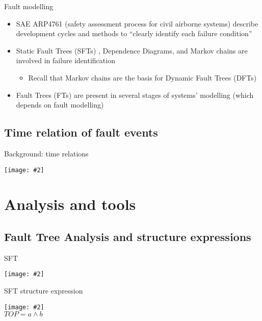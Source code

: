 \documentclass{beamer}
\def\FT{%
	Fault Tree (FT)%
	\gdef\FT{FT\xspace}%
	\gdef\FTs{FTs\xspace}%
	\gdef\IFT{An FT\xspace}%
	\xspace%
}
\def\FTs{%
	Fault Trees (FTs)%
	\gdef\FT{FT\xspace}%
	\gdef\FTs{FTs\xspace}%
	\gdef\IFT{An FT\xspace}%
	\xspace%
}
\def\IFT{%
	A Fault Tree (FT)%
	\gdef\FT{FT\xspace}%
	\gdef\FTs{FTs\xspace}%
	\gdef\IFT{An FT\xspace}%
	\xspace%
}
\def\SFT{%
	Static Fault Tree (SFT)%
	\gdef\SFT{SFT\xspace}%
	\gdef\SFTs{SFTs\xspace}%
	\xspace%
}
\def\SFTs{%
	Static Fault Trees (SFTs)%
	\gdef\SFT{SFT\xspace}%
	\gdef\SFTs{SFTs\xspace}%
	\xspace%
}
\def\DFT{%
	Dynamic Fault Tree (DFT)%
	\gdef\DFT{DFT\xspace}%
	\gdef\DFTs{DFTs\xspace}%
	\xspace%
}
\def\DFTs{%
	Dynamic Fault Trees (DFTs)%
	\gdef\DFT{DFT\xspace}%
	\gdef\DFTs{DFTs\xspace}%
	\xspace%
}
\newcommand{\includegraphicsaspectratio}[2][1]{%
  \texttt{[image: \#2]}%
}
\begin{document}
\begin{frame}{Fault modelling}
	\begin{itemize}
		\item SAE ARP4761 (safety assessment process for civil airborne systems) describe development cycles and methods to ``clearly identify each failure condition''
		\item \SFTs, Dependence Diagrams, and Markov chains are involved in failure identification
		\begin{itemize}
			\item Recall that Markov chains are the basis for \DFTs
		\end{itemize}
		\item \FTs are present in several stages of systems' modelling (which depends on fault modelling)
	\end{itemize}
\end{frame}

\subsection{Time relation of fault events}

\begin{frame}{Background: time relations}
	\begin{center}
		\includegraphicsaspectratio[0.5]{time-relations}
	\end{center}
\end{frame}

\section{Analysis and tools}
\subsection{Fault Tree Analysis and structure expressions}
\begin{frame}{\SFT}
	\begin{center}
		\includegraphicsaspectratio[0.9]{sft-example-ald-software}
	\end{center}
\end{frame}

\begin{frame}{\SFT structure expression}
	\begin{center}
		\includegraphicsaspectratio[0.45]{ex-fault-tree1}\\
		$TOP = a \land b$
	\end{center}
\end{frame}
\end{document}
